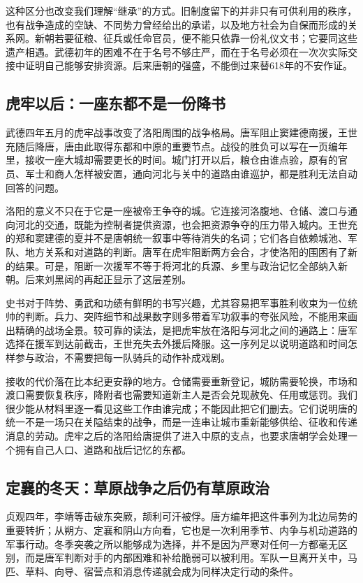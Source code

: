这种区分也改变我们理解“继承”的方式。旧制度留下的并非只有可供利用的秩序，也有战争造成的空缺、不同势力曾经给出的承诺，以及地方社会为自保而形成的关系网。新朝若要征粮、征兵或任命官员，便不能只依靠一份礼仪文书；它要同这些遗产相遇。武德初年的困难不在于名号不够庄严，而在于名号必须在一次次实际交接中证明自己能够安排资源。后来唐朝的强盛，不能倒过来替618年的不安作证。

\subsection{虎牢以后：一座东都不是一份降书}
武德四年五月的虎牢战事改变了洛阳周围的战争格局。唐军阻止窦建德南援，王世充随后降唐，唐由此取得东都和中原的重要节点。战役的胜负可以写在一页编年里，接收一座大城却需要更长的时间。城门打开以后，粮仓由谁点验，原有的官员、军士和商人怎样被安置，通向河北与关中的道路由谁巡护，都是胜利无法自动回答的问题。

洛阳的意义不只在于它是一座被帝王争夺的城。它连接河洛腹地、仓储、渡口与通向河北的交通，既能为控制者提供资源，也会把资源争夺的压力带入城内。王世充的郑和窦建德的夏并不是唐朝统一叙事中等待消失的名词；它们各自依赖城池、军队、地方关系和对道路的判断。唐军在虎牢阻断两方会合，才使洛阳的围困有了新的结果。可是，阻断一次援军不等于将河北的兵源、乡里与政治记忆全部纳入新朝。后来刘黑闼的再起正显示了这层差别。

史书对于阵势、勇武和功绩有鲜明的书写兴趣，尤其容易把军事胜利收束为一位统帅的判断。兵力、突阵细节和战果数字则多带着军功叙事的夸张风险，不能用来画出精确的战场全景。较可靠的读法，是把虎牢放在洛阳与河北之间的通路上：唐军选择在援军到达前截击，王世充失去外援后降服。这一序列足以说明道路和时间怎样参与政治，不需要把每一队骑兵的动作补成戏剧。

接收的代价落在比本纪更安静的地方。仓储需要重新登记，城防需要轮换，市场和渡口需要恢复秩序，降附者也需要知道新主人是否会兑现赦免、任用或惩罚。我们很少能从材料里逐一看见这些工作由谁完成；不能因此把它们删去。它们说明唐的统一不是一场只在关隘结束的战争，而是一连串让城市重新能够供给、征收和传递消息的劳动。虎牢之后的洛阳给唐提供了进入中原的支点，也要求唐朝学会处理一个拥有自己人口、道路和战后记忆的东都。

\subsection{定襄的冬天：草原战争之后仍有草原政治}
贞观四年，李靖等击破东突厥，颉利可汗被俘。唐方编年把这件事列为北边局势的重要转折；从朔方、定襄和阴山方向看，它也是一次利用季节、内争与机动道路的军事行动。冬季突袭之所以能够成为选择，并不是因为严寒对任何一方都毫无区别，而是唐军判断对手的内部困难和补给脆弱可以被利用。军队一旦离开关中，马匹、草料、向导、宿营点和消息传递就会成为同样决定行动的条件。

